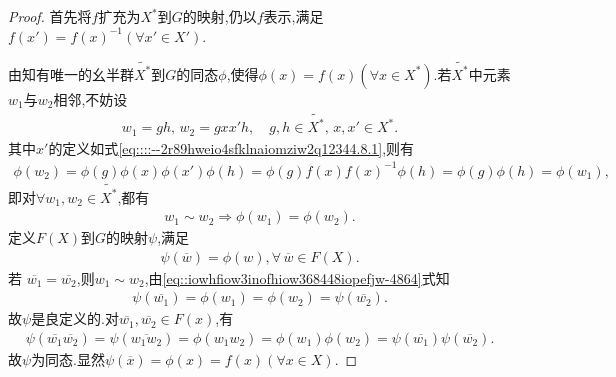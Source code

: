 \documentclass[../../main.tex]{subfiles}%
\begin{document}
\begin{proof}

首先将$f$扩充为$X^*$到$G$的映射,仍以$f$表示,满足$f(x')=f(x)^{-1}(\forall x'\in X')$.

由知有唯一的幺半群$\widetilde{X^*}$到$G$的同态$\phi$,使得$\phi(x)=f(x)(\forall x\in X^*)$.若$\widetilde{X^*}$中元素$w_1$与$w_2$相邻,不妨设
\begin{align*}
w_1=gh,\,w_2=gxx'h,\quad g,h\in \widetilde{X^*},\,x,x'\in X^*.
\end{align*}
其中$x'$的定义如式\eqref{eq::::--2r89hweio4sfklnaiomziw2q12344.8.1},则有
\begin{align*}
\phi (w_2)=\phi (g)\phi (x)\phi (x' )\phi (h)=\phi (g)f(x)f(x)^{-1}\phi (h)=\phi (g)\phi (h)=\phi (w_1),
\end{align*}
即对$\forall w_1,w_2\in \widetilde{X^*}$,都有
\begin{align}\label{eq::iowhfiow3inofhiow368448iopefjw-4864}
w_1\sim w_2\Longrightarrow  \phi(w_1)=\phi(w_2).
\end{align}
定义$F(X)$到$G$的映射$\psi$,满足
\begin{align*}
\psi(\overline{w})=\phi(w),\forall \,\overline{w}\in F(X).
\end{align*}
若
$\overline{w_1}=\overline{w_2}$,则$w_1\sim w_2$,由\eqref{eq::iowhfiow3inofhiow368448iopefjw-4864}式知
\begin{align*}
\psi \left( \overline{w_1} \right) =\phi \left( w_1 \right) =\phi \left( w_2 \right) =\psi \left( \overline{w_2} \right) .
\end{align*}
故$\psi$是良定义的.对$\overline{w_1},\overline{w_2}\in F(x)$,有
\begin{align*}
\psi \left( \overline{w_1}\overline{w_2} \right) =\psi \left( \overline{w_1w_2} \right) =\phi \left( w_1w_2 \right) =\phi \left( w_1 \right) \phi \left( w_2 \right) =\psi \left( \overline{w_1} \right) \psi \left( \overline{w_2} \right) .
\end{align*}
故$\psi$为同态.显然$\psi(\overline{x})=\phi(x)=f(x)(\forall x\in X)$. 


\end{proof}
\end{document}
